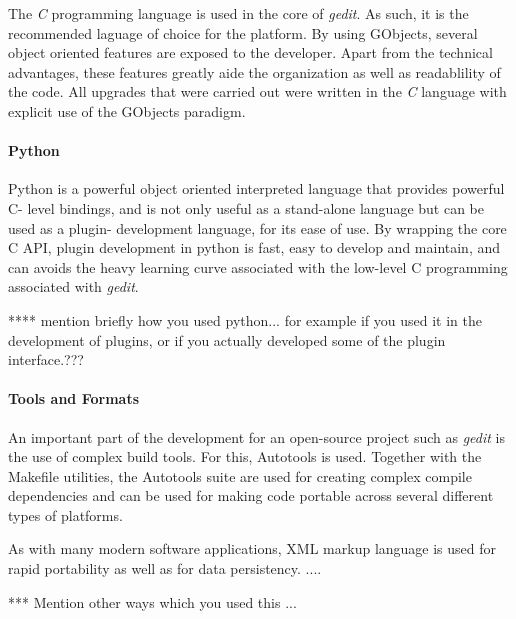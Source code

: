 The \emph{C} programming language is used in the core of \emph{gedit}.   As such, it is 
the recommended laguage of choice for the platform.  By using GObjects, several 
object oriented features are exposed to the developer.  Apart from the technical advantages, 
these features greatly aide the organization as well as readablility of the code.
All upgrades that were carried out were written in the \emph{C} language with explicit
use of the GObjects paradigm. 

\paragraph{Python}

Python is a powerful object oriented interpreted language that provides powerful 
C- level bindings, and is not only useful as a stand-alone language but can be used 
as a plugin- development language, for its ease of use.   By wrapping the core 
C API, plugin development in python is fast, easy to develop and maintain, and 
can avoids the heavy learning curve associated with the low-level C programming 
associated with \emph{gedit}.


**** mention briefly how you used python... for example if you used it 
  in the development of plugins, or if you actually developed some 
  of the plugin interface.???




\paragraph{Tools and Formats}


An important part of the development for an open-source project such as \emph{gedit} is 
the use of complex build tools.   For this, Autotools is used.   
Together with the Makefile utilities, the Autotools suite are used for creating complex
compile dependencies and can be used for making code portable across several different 
types of platforms.  

As with many modern software applications, XML markup language is used for 
rapid portability as well as for data persistency.  ....



***   Mention other ways which you used this ... 











